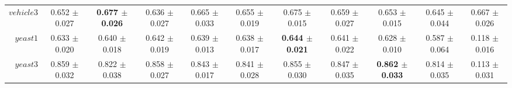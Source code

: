 \begin{table}[!ht]
{\begin{tabular}{r c c c c c c c c c c}
$vehicle3$ & 0.652 $\pm$ 0.027 & \textbf{0.677 $\pm$ 0.026} & 0.636 $\pm$ 0.027 & 0.665 $\pm$ 0.033 & 0.655 $\pm$ 0.019 & 0.675 $\pm$ 0.015 & 0.659 $\pm$ 0.027 & 0.653 $\pm$ 0.015 & 0.645 $\pm$ 0.044 & 0.667 $\pm$ 0.026 \\
$yeast1$ & 0.633 $\pm$ 0.020 & 0.640 $\pm$ 0.018 & 0.642 $\pm$ 0.019 & 0.639 $\pm$ 0.013 & 0.638 $\pm$ 0.017 & \textbf{0.644 $\pm$ 0.021} & 0.641 $\pm$ 0.022 & 0.628 $\pm$ 0.010 & 0.587 $\pm$ 0.064 & 0.118 $\pm$ 0.016 \\
$yeast3$ & 0.859 $\pm$ 0.032 & 0.822 $\pm$ 0.038 & 0.858 $\pm$ 0.027 & 0.843 $\pm$ 0.017 & 0.841 $\pm$ 0.028 & 0.855 $\pm$ 0.030 & 0.847 $\pm$ 0.035 & \textbf{0.862 $\pm$ 0.033} & 0.814 $\pm$ 0.035 & 0.113 $\pm$ 0.031 \\
\end{tabular}}
\end{table}
